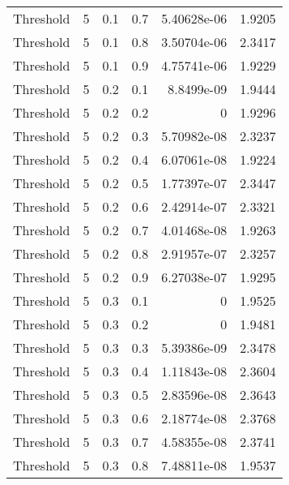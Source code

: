 \documentclass{article}
\begin{document}
\begin{longtable}[H]{lrrrrr}
 Threshold      &       5 &   0.1 &            0.7 &      5.40628e-06 &          1.9205 \\
 Threshold      &       5 &   0.1 &            0.8 &      3.50704e-06 &          2.3417 \\
 Threshold      &       5 &   0.1 &            0.9 &      4.75741e-06 &          1.9229 \\
 Threshold      &       5 &   0.2 &            0.1 &      8.8499e-09  &          1.9444 \\
 Threshold      &       5 &   0.2 &            0.2 &      0           &          1.9296 \\
 Threshold      &       5 &   0.2 &            0.3 &      5.70982e-08 &          2.3237 \\
 Threshold      &       5 &   0.2 &            0.4 &      6.07061e-08 &          1.9224 \\
 Threshold      &       5 &   0.2 &            0.5 &      1.77397e-07 &          2.3447 \\
 Threshold      &       5 &   0.2 &            0.6 &      2.42914e-07 &          2.3321 \\
 Threshold      &       5 &   0.2 &            0.7 &      4.01468e-08 &          1.9263 \\
 Threshold      &       5 &   0.2 &            0.8 &      2.91957e-07 &          2.3257 \\
 Threshold      &       5 &   0.2 &            0.9 &      6.27038e-07 &          1.9295 \\
 Threshold      &       5 &   0.3 &            0.1 &      0           &          1.9525 \\
 Threshold      &       5 &   0.3 &            0.2 &      0           &          1.9481 \\
 Threshold      &       5 &   0.3 &            0.3 &      5.39386e-09 &          2.3478 \\
 Threshold      &       5 &   0.3 &            0.4 &      1.11843e-08 &          2.3604 \\
 Threshold      &       5 &   0.3 &            0.5 &      2.83596e-08 &          2.3643 \\
 Threshold      &       5 &   0.3 &            0.6 &      2.18774e-08 &          2.3768 \\
 Threshold      &       5 &   0.3 &            0.7 &      4.58355e-08 &          2.3741 \\
 Threshold      &       5 &   0.3 &            0.8 &      7.48811e-08 &          1.9537 \\

\end{longtable}
\end{document}
